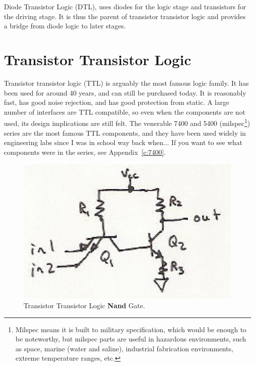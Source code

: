 Diode Transistor Logic (DTL), uses diodes for the logic stage and transistors for the driving stage.  It is thus the parent of transistor transistor logic and provides a bridge from diode logic to later stages.  

\section{Transistor Transistor Logic}
Transistor transistor logic (TTL) is arguably the most famous logic family.  It has been used for around 40 years, and can still be purchased today.  It is reasonably fast, has good noise rejection, and has good protection from static.  A large number of interfaces are TTL compatible, so even when the components are not used, its design implications are still felt.  The venerable 7400 and 5400 (milspec\footnote{Milspec means it is built to military specification, which would be enough to be noteworthy, but milspec parts are useful in hazardous environments, such as space, marine (water and saline), industrial fabrication environments, extreme temperature ranges, etc.}) series are the most famous TTL components, and they have been used widely in engineering labs since I was in school way back when...  If you want to see what components were in the series, see Appendix~\ref{c:7400}.



\begin{figure}
\begin{center}
\caption{Transistor Transistor Logic \textbf{Nand} Gate.}\label{f:TTL_nand}
\includegraphics{images/TTLnand.eps}
\end{center}
\end{figure}

